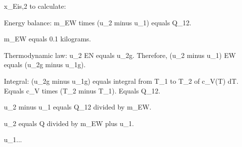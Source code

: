 x_Eis,2 to calculate:  

Energy balance:  
m_EW times (u_2 minus u_1) equals Q_12.  

m_EW equals 0.1 kilograms.  

Thermodynamic law: u_2 EN equals u_2g. Therefore, (u_2 minus u_1) EW equals (u_2g minus u_1g).  

Integral: (u_2g minus u_1g) equals integral from T_1 to T_2 of c_V(T) dT.  
Equals c_V times (T_2 minus T_1).  
Equals Q_12.  

u_2 minus u_1 equals Q_12 divided by m_EW.  

u_2 equals Q divided by m_EW plus u_1.  

u_1...